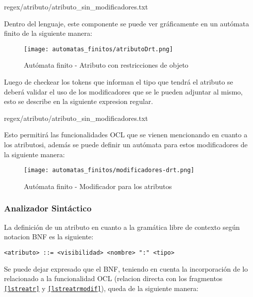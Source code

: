 \begin{lstinputlisting}[language=Director, basicstyle=\footnotesize\ttfamily, caption={Regex - Atributo (sin
Modificadores)}, label=lstreatr]{regex/atributo/atributo_sin_modificadores.txt}

Dentro del lenguaje, este componente se puede ver gráficamente en
un autómata finito de la siguiente manera:

\begin{figure}[H]
	\centering
	\texttt{[image: automatas\_finitos/atributoDrt.png]}
	\caption{Autómata finito - Atributo con restricciones de objeto}
	\label{fig:af_atr_modif}
\end{figure}

Luego de checkear los tokens que informan el tipo que tendrá el atributo se
deberá validar el uso de los modificadores que se le pueden adjuntar al
mismo, esto se describe en la siguiente expresion regular.

\begin{lstinputlisting} [basicstyle=\footnotesize, caption={Regex - Modificadores
  (Atributo)},
  label=lstreatrmodif]{regex/atributo/atributo_sin_modificadores.txt}

Esto permitirá las funcionalidades OCL que se vienen mencionando en cuanto a
los atributosi, además se puede definir un autómata para estos modificadores
de la siguiente manera:

\begin{figure}[H]
	\centering
	\texttt{[image: automatas\_finitos/modificadores-drt.png]}
	\caption{Autómata finito - Modificador para los atributos}
	\label{fig:af_atr_modif_OCL}
\end{figure}

\subsubsection{Analizador Sintáctico}

La definición de un atributo en cuanto a la gramática libre
de contexto según notacion BNF es la siguiente:

\begin{lstlisting}[caption={BNF - Atributo}, basicstyle=\footnotesize\ttfamily]
  <atributo> ::= <visibilidad> <nombre> ":" <tipo>
\end{lstlisting}

Se puede dejar expresado que el BNF, teniendo en cuenta la incorporación de lo
relacionado a la funcionalidad OCL (relacion directa con los fragmentos
\texttt{\ref{lstreatr}} y \texttt{\ref{lstreatrmodif}}), queda de la siguiente manera:


\end{lstinputlisting}
\end{lstinputlisting}
